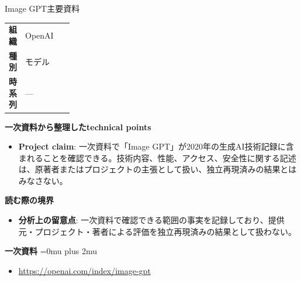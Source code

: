 \begin{technicalnote}{Image GPT}{主要資料}
\begingroup
\begin{tabularx}{\linewidth}{@{}>{\bfseries}p{0.22\linewidth}X@{}}
組織 & OpenAI \\
種別 & モデル \\
時系列 & — \\
\end{tabularx}
\smallskip
{\bfseries 一次資料から整理したtechnical points}
\begin{itemize}[leftmargin=1.5em,itemsep=0.35em]
\item \textbf{Project claim}: 一次資料で「Image GPT」が2020年の生成AI技術記録に含まれることを確認できる。技術内容、性能、アクセス、安全性に関する記述は、原著者またはプロジェクトの主張として扱い、独立再現済みの結果とはみなさない。
\end{itemize}
\begin{minipage}{\linewidth}
{\bfseries 読む際の境界}
\begin{itemize}[leftmargin=1.5em,itemsep=0.35em]
\item \textbf{分析上の留意点}: 一次資料で確認できる範囲の事実を記録しており、提供元・プロジェクト・著者による評価を独立再現済みの結果として扱わない。
\end{itemize}
\begin{samepage}
{\bfseries 一次資料}
\begingroup\sloppy
\Urlmuskip=0mu plus 2mu\relax
\begin{itemize}[leftmargin=1.5em,itemsep=0.25em]
\item {\scriptsize\url{https://openai.com/index/image-gpt}}
\end{itemize}
\endgroup
\end{samepage}
\end{minipage}
\endgroup
\end{technicalnote}
\medskip

